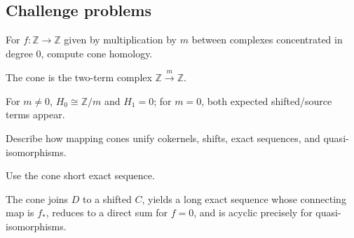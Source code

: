 \subsection*{Challenge problems}

\begin{exercise}\label{exr:viii24-ped-15}
For $f:\mathbb Z\to\mathbb Z$ given by multiplication by $m$ between complexes concentrated in degree $0$, compute cone homology.
\end{exercise}
\begin{hint}
The cone is the two-term complex $\mathbb Z\xrightarrow{m}\mathbb Z$.
\end{hint}
\begin{solution}
For $m\ne0$, $H_0\cong\mathbb Z/m$ and $H_1=0$; for $m=0$, both expected shifted/source terms appear.
\end{solution}

\begin{exercise}\label{exr:viii24-ped-16}
Describe how mapping cones unify cokernels, shifts, exact sequences, and quasi-isomorphisms.
\end{exercise}
\begin{hint}
Use the cone short exact sequence.
\end{hint}
\begin{solution}
The cone joins $D$ to a shifted $C$, yields a long exact sequence whose connecting map is $f_*$, reduces to a direct sum for $f=0$, and is acyclic precisely for quasi-isomorphisms.
\end{solution}

